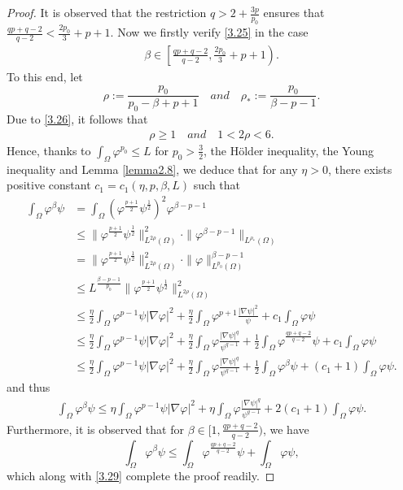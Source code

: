 \documentclass[12pt]{article}
\theoremstyle{plain}
\theoremstyle{definition}
\numberwithin{equation}{section}
\begin{document}
\begin{proof}
    It is observed that the restriction $q>2+\frac{3p}{p_0}$ ensures that
    $ \frac{qp+q-2}{q-2}<\frac{2p_0}{3}+p+1.$
    Now we firstly verify \eqref{3.25} in the case
        \begin{align}\label{3.26}
        \beta \in \left[\frac{qp+q-2}{q-2},\frac{2p_0}{3}+p+1\right).
    \end{align}
    To this end, let
 $$\rho:=\frac{p_0}{p_0-\beta+p+1}\quad and \quad \rho_*:=\frac{p_0}{\beta-p-1}.$$
    Due to \eqref{3.26}, it follows that
    \begin{align}\label{3.28}
        \rho\geq1\quad and\quad 1<2\rho<6.
    \end{align}
Hence, thanks to  $\int_{\Omega}\varphi^{p_0}\leq L$ for $p_0>\frac{3}{2}$, the H\"{o}lder inequality, the Young inequality and Lemma \ref{lemma2.8},  we deduce that for any $\eta>0$, there exists
positive constant  $c_1=c_1(\eta,p,\beta,L)$  such that
\begin{align*}
    \int_{\Omega}\varphi^{\beta}\psi&=\int_{\Omega}(\varphi^{\frac{p+1}{2}}\psi^{\frac{1}{2}})^2\varphi^{\beta-p-1}\nonumber
    \\
    &\leq\|\varphi^{\frac{p+1}{2}}\psi^{\frac{1}{2}}\|^2_{L^{2\rho}(\Omega)}\cdot\|\varphi^{\beta-p-1}\|_{L^{\rho_*}(\Omega)}\nonumber
    \\
    &=\|\varphi^{\frac{p+1}{2}}\psi^{\frac{1}{2}}\|^2_{L^{2\rho}(\Omega)}\cdot\|\varphi\|_{L^{p_0}(\Omega)}^{\beta-p-1}\nonumber
    \\
    &\leq L^{\frac {\beta-p-1}{p_0}}\|\varphi^{\frac{p+1}{2}}\psi^{\frac{1}{2}}\|^2_{L^{2\rho}(\Omega)}\nonumber
    \\
    &\leq \frac{\eta}{2}\int_{\Omega}\varphi^{p-1}\psi|\nabla
    \varphi|^2+\frac{\eta}{2}\int_{\Omega}\varphi^{p+1}\frac{|\nabla
    \psi|^2}{\psi}+c_1\int_{\Omega}\varphi\psi\nonumber
    \\
    &\leq \frac{\eta}{2}\int_{\Omega}\varphi^{p-1}\psi|\nabla
    \varphi|^2+\frac{\eta}{2}\int_{\Omega}\varphi\frac{|\nabla
    \psi|^q}{\psi^{q-1}}+\frac 12\int_{\Omega}\varphi^{\frac{qp+q-2}{q-2}}\psi+c_1\int_{\Omega}\varphi\psi\nonumber
     \\
    &\leq \frac{\eta}{2}\int_{\Omega}\varphi^{p-1}\psi|\nabla
    \varphi|^2+\frac{\eta}{2}\int_{\Omega}\varphi\frac{|\nabla
    \psi|^q}{\psi^{q-1}}+
    \frac{1}{2}\int_{\Omega}\varphi^{\beta}\psi+
    (c_1+1)\int_{\Omega}\varphi\psi.
\end{align*}
 and thus
\begin{align}\label{3.29}
 \int_{\Omega}\varphi^{\beta}\psi\leq \eta\int_{\Omega}\varphi^{p-1}\psi|\nabla
\varphi|^2+\eta\int_{\Omega}\varphi\frac{|\nabla
\psi|^q}{\psi^{q-1}}+2 (c_1+1) \int_{\Omega}\varphi\psi.
\end{align}
Furthermore, it is observed that  for $\beta \in [1, \frac{qp+q-2}{q-2})$, we have $$\int_{\Omega}\varphi^{\beta}\psi\leq
    \int_{\Omega}\varphi^{\frac{qp+q-2}{q-2}}\psi+\int_{\Omega}\varphi\psi, $$
which along with \eqref{3.29}  complete the proof readily.
\end{proof}
\end{document}
